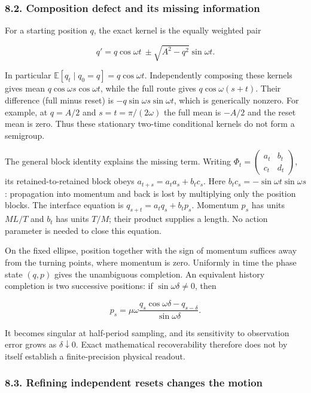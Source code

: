 \documentclass[11pt,a4paper]{article}
\begin{document}
\hypertarget{composition-defect-and-its-missing-information}{%
\subsubsection{8.2. Composition defect and its missing
information}\label{composition-defect-and-its-missing-information}}

For a starting position \(q\), the exact kernel is the equally weighted
pair

\[q'=q\cos\omega t\ \pm\sqrt{A^2-q^2}\sin\omega t.\]

In particular \(\mathbb E[q_t\mid q_0=q]=q\cos\omega t\). Independently
composing these kernels gives mean \(q\cos\omega s\cos\omega t\), while
the full route gives \(q\cos\omega(s+t)\). Their difference (full minus
reset) is \(-q\sin\omega s\sin\omega t\), which is generically nonzero.
For example, at \(q=A/2\) and \(s=t=\pi/(2\omega)\) the full mean is
\(-A/2\) and the reset mean is zero. Thus these stationary two-time
conditional kernels do not form a semigroup.

The general block identity explains the missing term. Writing
\(\Phi_t=\left(\begin{smallmatrix}a_t&b_t\\c_t&d_t\end{smallmatrix}\right)\),
its retained-to-retained block obeys \(a_{t+s}=a_ta_s+b_tc_s\). Here
\(b_tc_s=-\sin\omega t\sin\omega s\): propagation into momentum and back
is lost by multiplying only the position blocks. The interface equation
is \(q_{s+t}=a_tq_s+b_tp_s\). Momentum \(p_s\) has units \(ML/T\) and
\(b_t\) has units \(T/M\); their product supplies a length. No action
parameter is needed to close this equation.

On the fixed ellipse, position together with the sign of momentum
suffices away from the turning points, where momentum is zero. Uniformly
in time the phase state \((q,p)\) gives the unambiguous completion. An
equivalent history completion is two successive positions: if
\(\sin\omega\delta\ne0\), then

\[p_s=\mu\omega\frac{q_s\cos\omega\delta-q_{s-\delta}}
 {\sin\omega\delta}.\]

It becomes singular at half-period sampling, and its sensitivity to
observation error grows as \(\delta\downarrow0\). Exact mathematical
recoverability therefore does not by itself establish a finite-precision
physical readout.

\hypertarget{refining-independent-resets-changes-the-motion}{%
\subsubsection{8.3. Refining independent resets changes the
motion}\label{refining-independent-resets-changes-the-motion}}
\end{document}
